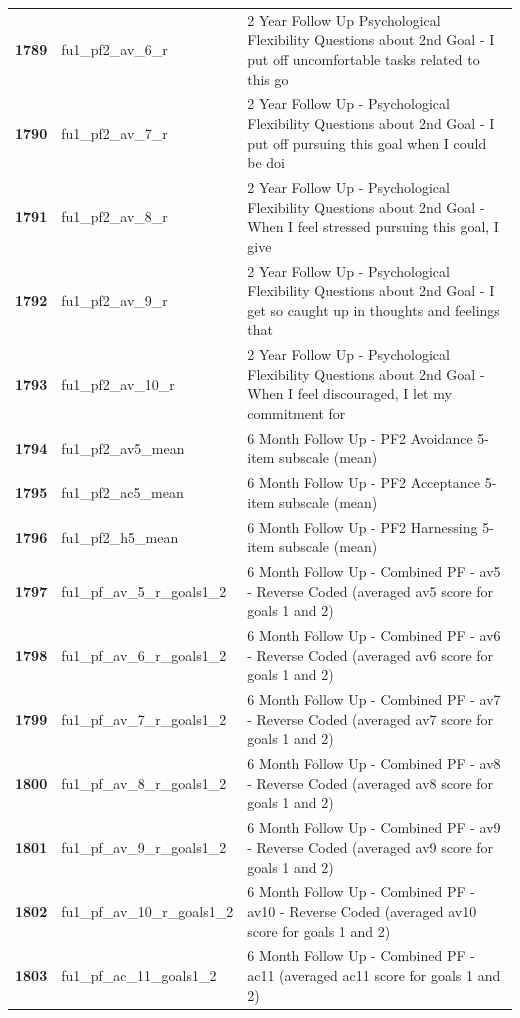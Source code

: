 \documentclass[
  letterpaper,
  DIV=11,
  numbers=noendperiod]{scrartcl}
\begin{document}
\begin{longtable}[t]{>{}cll}
\textbf{1789} & fu1\_pf2\_av\_6\_r & 2 Year Follow Up Psychological Flexibility Questions about 2nd Goal - I put off uncomfortable tasks related to this go\\
\textbf{1790} & fu1\_pf2\_av\_7\_r & 2 Year Follow Up - Psychological Flexibility Questions about 2nd Goal - I put off pursuing this goal when I could be doi\\
\addlinespace
\textbf{1791} & fu1\_pf2\_av\_8\_r & 2 Year Follow Up - Psychological Flexibility Questions about 2nd Goal - When I feel stressed pursuing this goal, I give\\
\textbf{1792} & fu1\_pf2\_av\_9\_r & 2 Year Follow Up - Psychological Flexibility Questions about 2nd Goal - I get so caught up in thoughts and feelings that\\
\textbf{1793} & fu1\_pf2\_av\_10\_r & 2 Year Follow Up - Psychological Flexibility Questions about 2nd Goal - When I feel discouraged, I let my commitment for\\
\textbf{1794} & fu1\_pf2\_av5\_mean & 6 Month Follow Up - PF2 Avoidance 5-item subscale (mean)\\
\textbf{1795} & fu1\_pf2\_ac5\_mean & 6 Month Follow Up - PF2 Acceptance 5-item subscale (mean)\\
\addlinespace
\textbf{1796} & fu1\_pf2\_h5\_mean & 6 Month Follow Up - PF2 Harnessing 5-item subscale (mean)\\
\textbf{1797} & fu1\_pf\_av\_5\_r\_goals1\_2 & 6 Month Follow Up - Combined PF - av5 - Reverse Coded (averaged av5 score for goals 1 and 2)\\
\textbf{1798} & fu1\_pf\_av\_6\_r\_goals1\_2 & 6 Month Follow Up - Combined PF - av6 - Reverse Coded (averaged av6 score for goals 1 and 2)\\
\textbf{1799} & fu1\_pf\_av\_7\_r\_goals1\_2 & 6 Month Follow Up - Combined PF - av7 - Reverse Coded (averaged av7 score for goals 1 and 2)\\
\textbf{1800} & fu1\_pf\_av\_8\_r\_goals1\_2 & 6 Month Follow Up - Combined PF - av8 - Reverse Coded (averaged av8 score for goals 1 and 2)\\
\addlinespace
\textbf{1801} & fu1\_pf\_av\_9\_r\_goals1\_2 & 6 Month Follow Up - Combined PF - av9 - Reverse Coded (averaged av9 score for goals 1 and 2)\\
\textbf{1802} & fu1\_pf\_av\_10\_r\_goals1\_2 & 6 Month Follow Up - Combined PF - av10 - Reverse Coded (averaged av10 score for goals 1 and 2)\\
\textbf{1803} & fu1\_pf\_ac\_11\_goals1\_2 & 6 Month Follow Up - Combined PF - ac11 (averaged ac11 score for goals 1 and 2)\\

\end{longtable}
\end{document}

